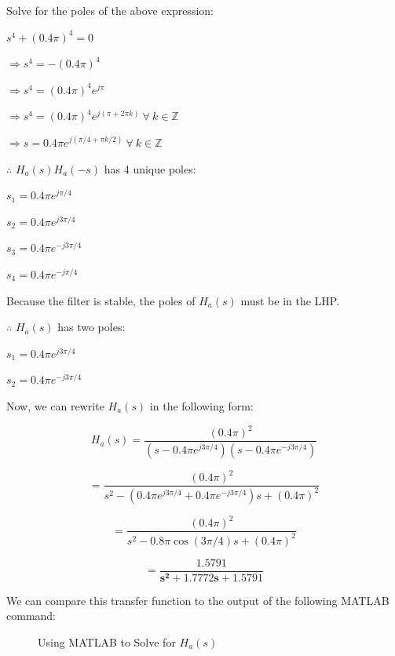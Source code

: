 \documentclass[fleqn]{article}
\begin{document}
\begin{enumerate}[nolistsep]
\begin{enumerate}[nolistsep]
				Solve for the poles of the above expression:
				
				$s^4 + (0.4\pi)^4 = 0$
				
				$\Rightarrow s^4 = -(0.4\pi)^4$
				
				$\Rightarrow s^4 = (0.4\pi)^4e^{j\pi}$
				
				$\Rightarrow s^4 = (0.4\pi)^4e^{j(\pi + 2{\pi}k)}\ \forall\ k \in \mathbb{Z}$
				
				$\Rightarrow s = 0.4{\pi}e^{j({\pi/4} + {\pi}k/2)}\ \forall\ k \in \mathbb{Z}$
				
				$\therefore$ $H_a(s)H_a(-s)$ has 4 unique poles:
				
				$s_1 = 0.4{\pi}e^{j{\pi}/4}$
				
				$s_2 = 0.4{\pi}e^{j3{\pi}/4}$
				
				$s_3 = 0.4{\pi}e^{-j3{\pi}/4}$
				
				$s_4 = 0.4{\pi}e^{-j{\pi}/4}$
				
				Because the filter is stable, the poles of $H_a(s)$ must be in the LHP.
				
				$\therefore$ $H_a(s)$ has two poles:
				
				$s_1 = 0.4{\pi}e^{j3{\pi}/4}$
				
				$s_2 = 0.4{\pi}e^{-j3{\pi}/4}$
				
				Now, we can rewrite $H_a(s)$ in the following form:
				
				\begin{equation*}
					H_a(s) = \frac{(0.4\pi)^2}{(s - 0.4{\pi}e^{j3{\pi}/4})(s - 0.4{\pi}e^{-j3{\pi}/4})}
				\end{equation*}
				
				\begin{equation*}
					= \frac{(0.4\pi)^2}{s^2 - (0.4{\pi}e^{j3{\pi}/4} + 0.4{\pi}e^{-j3{\pi}/4})s + (0.4\pi)^2}
				\end{equation*}
				
				\begin{equation*}
					= \frac{(0.4\pi)^2}{s^2 - 0.8\pi\cos(3\pi/4)s + (0.4\pi)^2}
				\end{equation*}
				
				\begin{equation*}
					\mathbf{= \frac{1.5791}{s^2 + 1.7772s + 1.5791}}
				\end{equation*}
				
				\pagebreak
				We can compare this transfer function to the output of the following MATLAB command:
				
				\begin{figure}[H]
					\centerline{}
					\caption{Using MATLAB to Solve for $H_a(s)$}
				\end{figure}
				

\end{enumerate}
\end{enumerate}
\end{document}
